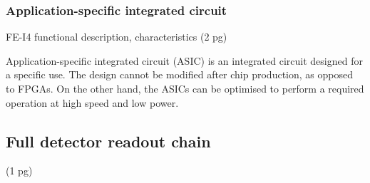 \documentclass[11pt]{mytustyle}  %
\begin{document}
\subsubsection{Application-specific integrated circuit}
FE-I4 functional description, characteristics
 (2 pg)

Application-specific integrated circuit (ASIC) is an integrated circuit designed for a specific use. The design cannot be modified after chip production, as opposed to FPGAs. On the other hand, the ASICs can be optimised to perform a required operation at high speed and low power. 

 
\subsection{Full detector readout chain}
(1 pg)


\end{document}
